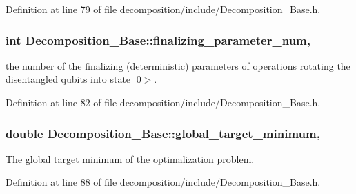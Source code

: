 Definition at line 79 of file decomposition/include/\+Decomposition\+\_\+\+Base.\+h.

\subsubsection[{\texorpdfstring{finalizing\+\_\+parameter\+\_\+num}{finalizing_parameter_num}}]{\setlength{\rightskip}{0pt plus 5cm}int Decomposition\+\_\+\+Base\+::finalizing\+\_\+parameter\+\_\+num\hspace{0.3cm}{\ttfamily [protected]}, {\ttfamily [inherited]}}\hypertarget{class_decomposition___base_ae83ca982ee7da29119245860d212864c}{}\label{class_decomposition___base_ae83ca982ee7da29119245860d212864c}


the number of the finalizing (deterministic) parameters of operations rotating the disentangled qubits into state $\vert$0$>$. 



Definition at line 82 of file decomposition/include/\+Decomposition\+\_\+\+Base.\+h.

\subsubsection[{\texorpdfstring{global\+\_\+target\+\_\+minimum}{global_target_minimum}}]{\setlength{\rightskip}{0pt plus 5cm}double Decomposition\+\_\+\+Base\+::global\+\_\+target\+\_\+minimum\hspace{0.3cm}{\ttfamily [protected]}, {\ttfamily [inherited]}}\hypertarget{class_decomposition___base_a6bc9e026221fab165ecc56f287d731a8}{}\label{class_decomposition___base_a6bc9e026221fab165ecc56f287d731a8}


The global target minimum of the optimalization problem. 



Definition at line 88 of file decomposition/include/\+Decomposition\+\_\+\+Base.\+h.

